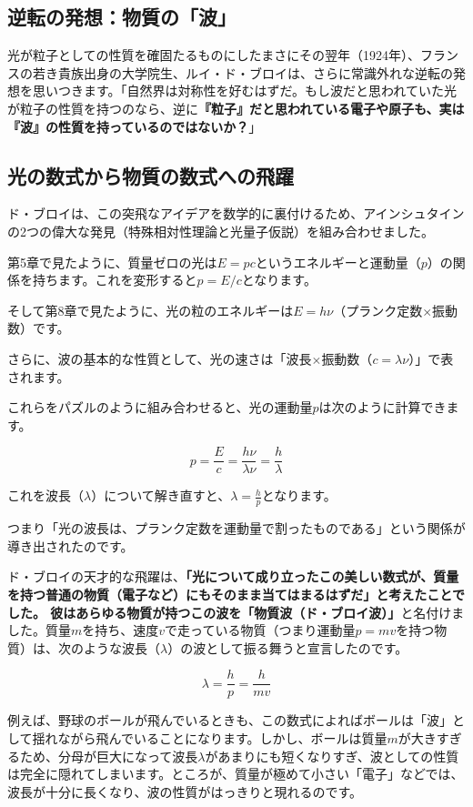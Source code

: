 \subsection{逆転の発想：物質の「波」}

光が粒子としての性質を確固たるものにしたまさにその翌年（1924年）、フランスの若き貴族出身の大学院生、ルイ・ド・ブロイは、さらに常識外れな逆転の発想を思いつきます。「自然界は対称性を好むはずだ。もし波だと思われていた光が粒子の性質を持つのなら、逆に\textbf{『粒子』だと思われている電子や原子も、実は『波』の性質を持っているのではないか？}」

\subsection{光の数式から物質の数式への飛躍}

ド・ブロイは、この突飛なアイデアを数学的に裏付けるため、アインシュタインの2つの偉大な発見（特殊相対性理論と光量子仮説）を組み合わせました。

第5章で見たように、質量ゼロの光は\(E = pc\)というエネルギーと運動量（\(p\)）の関係を持ちます。これを変形すると\(p = E/c\)となります。

そして第8章で見たように、光の粒のエネルギーは\(E = h\nu\)（プランク定数\(\times\)振動数）です。

さらに、波の基本的な性質として、光の速さは「波長\(\times\)振動数（\(c = \lambda\nu\)）」で表されます。

これらをパズルのように組み合わせると、光の運動量\(p\)は次のように計算できます。

\[p = \frac{E}{c} = \frac{h\nu}{\lambda\nu} = \frac{h}{\lambda}\]

これを波長（\(\lambda\)）について解き直すと、\(\lambda = \frac{h}{p}\)となります。

つまり「光の波長は、プランク定数を運動量で割ったものである」という関係が導き出されたのです。

ド・ブロイの天才的な飛躍は、\textbf{「光について成り立ったこの美しい数式が、質量を持つ普通の物質（電子など）にもそのまま当てはまるはずだ」と考えたことでした。 彼はあらゆる物質が持つこの波を「物質波（ド・ブロイ波）」}と名付けました。質量\(m\)を持ち、速度\(v\)で走っている物質（つまり運動量\(p=mv\)を持つ物質）は、次のような波長（\(\lambda\)）の波として振る舞うと宣言したのです。

\[\lambda = \frac{h}{p} = \frac{h}{mv}\]

例えば、野球のボールが飛んでいるときも、この数式によればボールは「波」として揺れながら飛んでいることになります。しかし、ボールは質量\(m\)が大きすぎるため、分母が巨大になって波長\(\lambda\)があまりにも短くなりすぎ、波としての性質は完全に隠れてしまいます。ところが、質量が極めて小さい「電子」などでは、波長が十分に長くなり、波の性質がはっきりと現れるのです。

